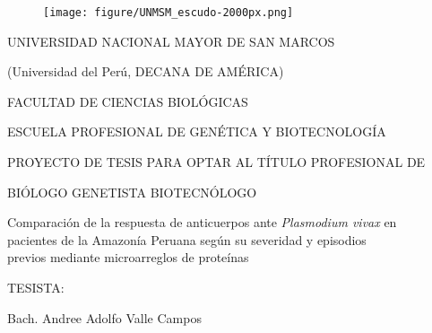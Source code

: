 \documentclass[a4paper]{article}
\title{}
\author{}
\date{}
\begin{document}
\renewcommand{\contentsname}{Índice General} 
\renewcommand{\tablename}{Tabla}
\renewcommand{\tableautorefname}{Tabla}


\clearpage
{}

\begin{centering}

\begin{figure}[!ht]
  \begin{center}
    \texttt{[image: figure/UNMSM\_escudo-2000px.png]}%
  \end{center}
\end{figure}

\LARGE %
UNIVERSIDAD NACIONAL MAYOR DE SAN MARCOS

\large
(Universidad del Perú, DECANA DE AMÉRICA)


\Large
FACULTAD DE CIENCIAS BIOLÓGICAS


\large
ESCUELA PROFESIONAL DE GENÉTICA Y BIOTECNOLOGÍA

\vspace{.5 cm}

\Large
PROYECTO DE TESIS PARA OPTAR AL TÍTULO PROFESIONAL DE 

BIÓLOGO GENETISTA BIOTECNÓLOGO

\vspace{2.5 cm}

\Large
Comparación de la respuesta de anticuerpos ante %
\textit{Plasmodium vivax}
en \\pacientes de la Amazonía Peruana %
según su severidad y episodios \\previos %
mediante microarreglos de proteínas

\vspace{2.5 cm}

\large
TESISTA:

Bach. Andree Adolfo Valle Campos

\vspace{.3 cm}


\end{centering}
\end{document}
